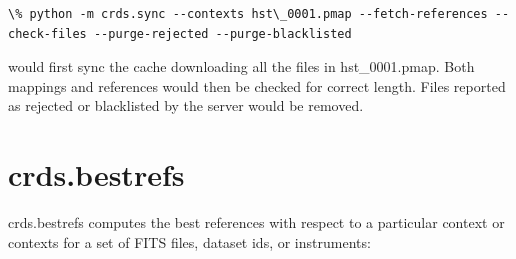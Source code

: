 \documentclass[letterpaper,10pt,english]{sphinxmanual}
\begin{document}
\begin{Verbatim}[commandchars=\\\{\}]
\% python -m crds.sync --contexts hst\_0001.pmap --fetch-references --check-files --purge-rejected --purge-blacklisted
\end{Verbatim}

would first sync the cache downloading all the files in hst\_0001.pmap.  Both mappings and references would then
be checked for correct length.   Files reported as rejected or blacklisted by the server would be removed.


\section{crds.bestrefs}
\label{command_line_tools:crds-bestrefs}
crds.bestrefs computes the best references with respect to a particular context or contexts
for a set of FITS files, dataset ids,  or instruments:
\end{document}
